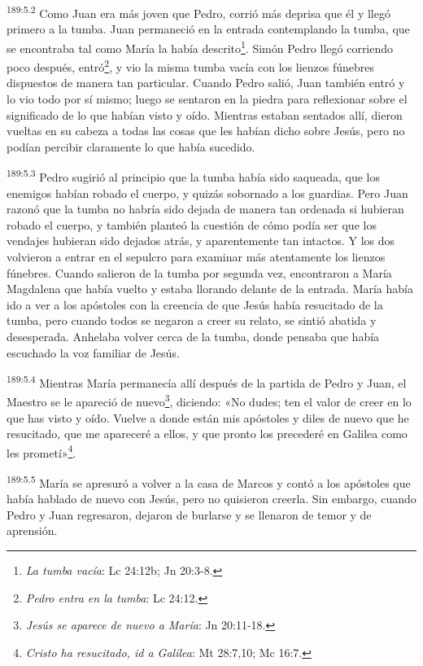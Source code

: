 \par 
\textsuperscript{189:5.2} Como Juan era más joven que Pedro, corrió más deprisa que él y llegó primero a la tumba. Juan permaneció en la entrada contemplando la tumba, que se encontraba tal como María la había descrito\footnote{\textit{La tumba vacía}: Lc 24:12b; Jn 20:3-8.}. Simón Pedro llegó corriendo poco después, entró\footnote{\textit{Pedro entra en la tumba}: Lc 24:12.}, y vio la misma tumba vacía con los lienzos fúnebres dispuestos de manera tan particular. Cuando Pedro salió, Juan también entró y lo vio todo por sí mismo; luego se sentaron en la piedra para reflexionar sobre el significado de lo que habían visto y oído. Mientras estaban sentados allí, dieron vueltas en su cabeza a todas las cosas que les habían dicho sobre Jesús, pero no podían percibir claramente lo que había sucedido.

\par 
\textsuperscript{189:5.3} Pedro sugirió al principio que la tumba había sido saqueada, que los enemigos habían robado el cuerpo, y quizás sobornado a los guardias. Pero Juan razonó que la tumba no habría sido dejada de manera tan ordenada si hubieran robado el cuerpo, y también planteó la cuestión de cómo podía ser que los vendajes hubieran sido dejados atrás, y aparentemente tan intactos. Y los dos volvieron a entrar en el sepulcro para examinar más atentamente los lienzos fúnebres. Cuando salieron de la tumba por segunda vez, encontraron a María Magdalena que había vuelto y estaba llorando delante de la entrada. María había ido a ver a los apóstoles con la creencia de que Jesús había resucitado de la tumba, pero cuando todos se negaron a creer su relato, se sintió abatida y desesperada. Anhelaba volver cerca de la tumba, donde pensaba que había escuchado la voz familiar de Jesús.

\par 
\textsuperscript{189:5.4} Mientras María permanecía allí después de la partida de Pedro y Juan, el Maestro se le apareció de nuevo\footnote{\textit{Jesús se aparece de nuevo a María}: Jn 20:11-18.}, diciendo: «No dudes; ten el valor de creer en lo que has visto y oído. Vuelve a donde están mis apóstoles y diles de nuevo que he resucitado, que me apareceré a ellos, y que pronto los precederé en Galilea como les prometí»\footnote{\textit{Cristo ha resucitado, id a Galilea}: Mt 28:7,10; Mc 16:7.}.

\par 
\textsuperscript{189:5.5} María se apresuró a volver a la casa de Marcos y contó a los apóstoles que había hablado de nuevo con Jesús, pero no quisieron creerla. Sin embargo, cuando Pedro y Juan regresaron, dejaron de burlarse y se llenaron de temor y de aprensión.